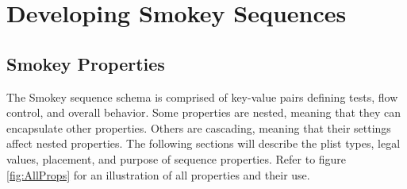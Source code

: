 \begin{comment}
Once the files are set up, simulator usage is fairly straightforward:

1. "cd" into the Smokey directory
	cd /path/to/Blaze/Smokey
2. Run Smokey
	SmokeySimulator --link /path/to/uart [other arguments here]

Note that, at this point, the sequence name given at the command line will
actually be a directory name relative to the current working directory.  This
is a convenient way of emulating the command line used on the DUT.  Also note
that the default search path for shared Smokey files maps to
Blaze/Smokey/Shared under these circumstances, so the --shared argument is not
required.

To re-run a sequence that has already generated output, you can use "make
files" zero the output files.

\end{comment}


\section{Developing Smokey Sequences}

\subsection{Smokey Properties}
\label{sec:SmokeyProps}

The Smokey sequence schema is comprised of key-value pairs defining tests, flow
control, and overall behavior.  Some properties are nested, meaning that they
can encapsulate other properties.  Others are cascading, meaning that their
settings affect nested properties.  The following sections will describe the
plist types, legal values, placement, and purpose of sequence properties.
Refer to figure \ref{fig:AllProps} for an illustration of all properties and
their use.

